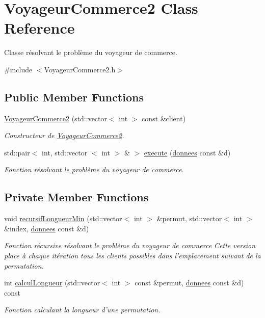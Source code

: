 \hypertarget{classVoyageurCommerce2}{\section{\-Voyageur\-Commerce2 \-Class \-Reference}
\label{classVoyageurCommerce2}
}


\-Classe résolvant le problème du voyageur de commerce.  




{\ttfamily \#include $<$\-Voyageur\-Commerce2.\-h$>$}

\subsection*{\-Public \-Member \-Functions}
\begin{DoxyCompactItemize}
\item 
\hyperlink{classVoyageurCommerce2_ae0e33eda0bd53e2eaab990aaaaa4c6aa}{\-Voyageur\-Commerce2} (std\-::vector$<$ int $>$ const \&client)
\begin{DoxyCompactList}\small\item\em \-Constructeur de \hyperlink{classVoyageurCommerce2}{\-Voyageur\-Commerce2}. \end{DoxyCompactList}\item 
std\-::pair$<$ int, std\-::vector\*
$<$ int $>$ \& $>$ \hyperlink{classVoyageurCommerce2_a54b51df91822967a636dc24fc600fd17}{execute} (\hyperlink{structdonnees}{donnees} const \&d)
\begin{DoxyCompactList}\small\item\em \-Fonction résolvant le problème du voyageur de commerce. \end{DoxyCompactList}\end{DoxyCompactItemize}
\subsection*{\-Private \-Member \-Functions}
\begin{DoxyCompactItemize}
\item 
void \hyperlink{classVoyageurCommerce2_ae4f74cbd4dcb49cd2f67bfd79bd9c479}{recursif\-Longueur\-Min} (std\-::vector$<$ int $>$ \&permut, std\-::vector$<$ int $>$ \&index, \hyperlink{structdonnees}{donnees} const \&d)
\begin{DoxyCompactList}\small\item\em \-Fonction récursive résolvant le problème du voyageur de commerce \-Cette version place à chaque itération tous les clients possibles dans l'emplacement suivant de la permutation. \end{DoxyCompactList}\item 
int \hyperlink{classVoyageurCommerce2_a552b0a93b0b9783e6c0eb7f33c96a00c}{calcul\-Longueur} (std\-::vector$<$ int $>$ const \&permut, \hyperlink{structdonnees}{donnees} const \&d) const 
\begin{DoxyCompactList}\small\item\em \-Fonction calculant la longueur d'une permutation. \end{DoxyCompactList}\end{DoxyCompactItemize}
